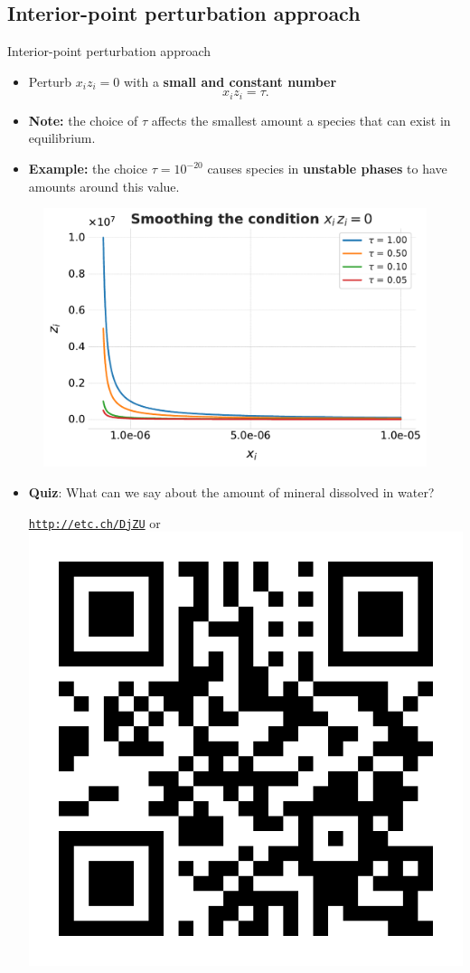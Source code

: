 \subsection{Interior-point perturbation approach}
%
\begin{frame}{Interior-point perturbation approach}
\small 
\lcol
\begin{itemize}
\item Perturb $x_{i}z_{i}=0$ with a \alert{\textbf{small and constant number}}
%
\[
x_{i}z_{i}=\tau.
\]
\item \textbf{Note:} the choice of $\tau$ affects the smallest amount a
species that can exist in equilibrium. 
\item \textbf{Example:} the choice $\tau=10^{-20}$ causes species in
\textbf{unstable phases} to have amounts around this value.  
\end{itemize}
\rcol

\begin{figure}
\centering{}\includegraphics[width=0.8\columnwidth]{figures/numerical-methods-chemical-equilibrium/smoothing-complementarity-condition}
\end{figure}

\ecol

\vskip 5pt
\begin{itemize}
	\item \alert{\bf Quiz}: What can we say about the amount of mineral dissolved in water?
	\begin{center}
		\href{http://etc.ch/DjZU}{\textcolor{indigo(dye)}{\tt http://etc.ch/DjZU}} \quad or \quad 
		\includegraphics[height=0.1\columnwidth]{figures/numerical-methods-chemical-equilibrium/polls.png}
	\end{center}
\end{itemize}
\end{frame}
